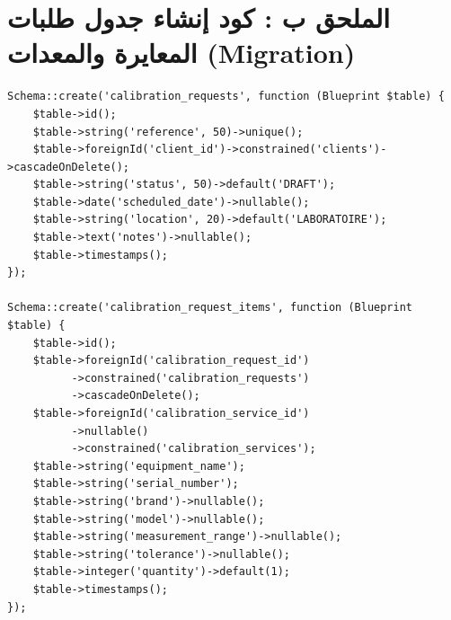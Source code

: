 \documentclass{bts-report-ar}
\begin{document}
\section*{الملحق ب : كود إنشاء جدول طلبات المعايرة والمعدات (Migration)}
\begin{LTR}
\begin{verbatim}
Schema::create('calibration_requests', function (Blueprint $table) {
    $table->id();
    $table->string('reference', 50)->unique();
    $table->foreignId('client_id')->constrained('clients')->cascadeOnDelete();
    $table->string('status', 50)->default('DRAFT');
    $table->date('scheduled_date')->nullable();
    $table->string('location', 20)->default('LABORATOIRE');
    $table->text('notes')->nullable();
    $table->timestamps();
});

Schema::create('calibration_request_items', function (Blueprint $table) {
    $table->id();
    $table->foreignId('calibration_request_id')
          ->constrained('calibration_requests')
          ->cascadeOnDelete();
    $table->foreignId('calibration_service_id')
          ->nullable()
          ->constrained('calibration_services');
    $table->string('equipment_name');
    $table->string('serial_number');
    $table->string('brand')->nullable();
    $table->string('model')->nullable();
    $table->string('measurement_range')->nullable();
    $table->string('tolerance')->nullable();
    $table->integer('quantity')->default(1);
    $table->timestamps();
});
\end{verbatim}
\end{LTR}
\end{document}
